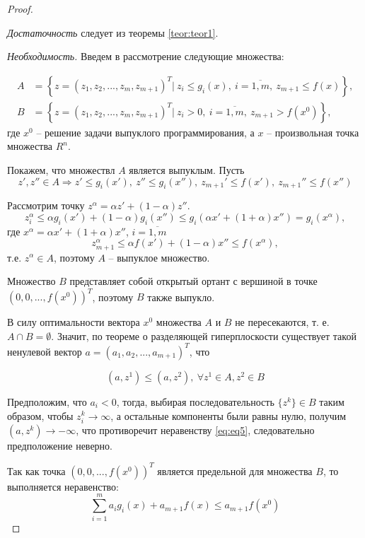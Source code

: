 \documentclass[12pt,a4paper,titlepage,oneside]{book}
\theoremstyle{definition}
\theoremstyle{plain}
\theoremstyle{remark}
\theoremstyle{remark}
\theoremstyle{plain}
\theoremstyle{plain}
\begin{document}
\begin{proof}~
		
\emph{Достаточность} следует из теоремы \ref{teor:teor1}.

\emph{Необходимость.} Введем в рассмотрение следующие множества:

\begin{align*}
A &= \left\{z = (z_1,z_2,...,z_m,z_{m+1})^T|~z_i \leqslant g_i(x),~i = \overline{1,m},~z_{m+1} \leqslant f(x) \right\}, \\
B &= \left\{z = (z_1,z_2,...,z_m,z_{m+1})^T|~z_i > 0,~i = \overline{1,m},~z_{m+1} >f(x^0) \right\},
\end{align*}
где $x^0$ -- решение задачи выпуклого программирования, а $x$ -- произвольная точка множества $\textit{R}^n$.

Покажем, что множествл $A$ является выпуклым. Пусть
$$z',z'' \in A \Rightarrow z' \leqslant g_i(x'),~ z'' \leqslant g_i(x''),~ z_{m+1}' \leqslant f(x'),~z_{m+1}'' \leqslant f(x'')$$

Рассмотрим точку $z^\alpha = \alpha z' + (1-\alpha)z''$.
$$z_i^\alpha \leqslant \alpha g_i(x') + (1-\alpha)g_i(x'') \leqslant g_i(\alpha x' + (1+\alpha) x'') = g_i(x^\alpha),$$
где $x^\alpha = \alpha x' + (1+\alpha) x''$, $i=\overline{1,m}$
$$z_{m+1}^\alpha \leqslant \alpha f(x') + (1-\alpha)x'' \leqslant f(x^\alpha),$$
т.е. $z^\alpha \in A$, поэтому $A$ -- выпуклое множество.

Множество $B$ представляет собой открытый ортант с вершиной в точке $(0,0,...,f(x^0))^T$, поэтому $B$ также выпукло.

В силу оптимальности вектора $x^0$ множества $A$ и $B$ не пересекаются, т. е. $A \cap B = \emptyset$. Значит, по теореме о разделяющей гиперплоскости существует такой ненулевой вектор $a = (a_1,a_2,...,a_{m+1})^T$, что

\begin{equation}\label{eq:eq5}
(a,z^1) \leqslant (a,z^2),~ \forall z^1 \in A, z^2 \in B
\end{equation}

Предположим, что $a_i < 0$, тогда, выбирая последовательность $\{z^k\} \in B$ таким образом, чтобы $z_i^k \rightarrow \infty$, а остальные компоненты были равны нулю, получим $(a,z^k) \rightarrow -\infty$, что противоречит неравенству \eqref{eq:eq5}, следовательно предположение неверно. 

Так как точка $(0,0,...,f(x^0))^T$ является предельной для множества $B$, то выполняется неравенство:
\begin{equation}\label{eq:eq6}
\sum_{i=1}^m a_i g_i(x) + a_{m+1} f(x) \leqslant a_{m+1} f(x^0)
\end{equation}


\end{proof}
\end{document}
